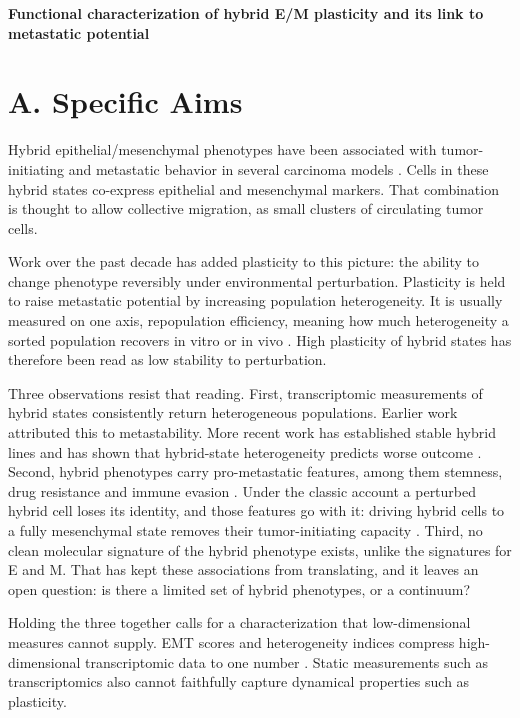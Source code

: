\documentclass[12pt,letterpaper]{article}
\newcommand{\chg}[1]{\textcolor{chgcolor}{#1}}
\newcommand{\chg}[1]{#1}
\begin{document}
\begin{center}
{\large\bfseries Functional characterization of hybrid E/M plasticity and its link to metastatic potential}
\end{center}

\vspace{2pt}

\section{A. Specific Aims}

\chg{Hybrid epithelial/mesenchymal phenotypes have been associated with tumor-initiating and metastatic behavior in several carcinoma models \cite{jolly2019,pastushenko2018}. Cells in these hybrid states co-express epithelial and mesenchymal markers. That combination is thought to allow collective migration, as small clusters of circulating tumor cells.

Work over the past decade has added plasticity to this picture: the ability to change phenotype reversibly under environmental perturbation. Plasticity is held to raise metastatic potential by increasing population heterogeneity. It is usually measured on one axis, repopulation efficiency, meaning how much heterogeneity a sorted population recovers in vitro or in vivo \cite{gupta2011,pastushenko2018,ruscetti2016,brown2022}. High plasticity of hybrid states has therefore been read as low stability to perturbation.

Three observations resist that reading. First, transcriptomic measurements of hybrid states consistently return heterogeneous populations. Earlier work attributed this to metastability. More recent work has established stable hybrid lines \cite{kroger2019} and has shown that hybrid-state heterogeneity predicts worse outcome \cite{brown2022}. Second, hybrid phenotypes carry pro-metastatic features, among them stemness, drug resistance and immune evasion \cite{mani2008,sahoo2021}. Under the classic account a perturbed hybrid cell loses its identity, and those features go with it: driving hybrid cells to a fully mesenchymal state removes their tumor-initiating capacity \cite{kroger2019}. Third, no clean molecular signature of the hybrid phenotype exists, unlike the signatures for E and M. That has kept these associations from translating, and it leaves an open question: is there a limited set of hybrid phenotypes, or a continuum?

Holding the three together calls for a characterization that low-dimensional measures cannot supply. EMT scores and heterogeneity indices compress high-dimensional transcriptomic data to one number \cite{tan2014,george2017,mroz2013}. Static measurements such as transcriptomics also cannot faithfully capture dynamical properties such as plasticity.

}
\end{document}
